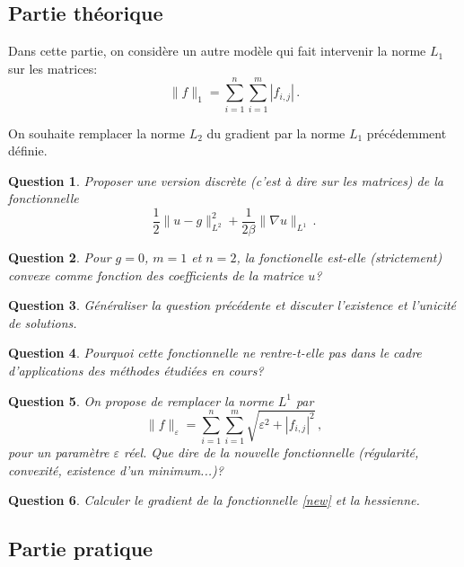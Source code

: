 \documentclass[10pt,a4paper,fleqn]{report}
\newtheorem{question}{Question}
\begin{document}
\subsection{Partie théorique}
Dans cette partie, on consid\`ere un autre mod\`ele qui fait intervenir la norme $L_1$ sur les matrices:
\begin{equation}
\| f \|_{1} = \sum_{i=1}^n \sum_{i=1}^m |f_{i,j}| \,.
\end{equation}

On souhaite remplacer la norme $L_2$ du gradient par la norme $L_1$ pr\'ec\'edemment d\'efinie.

\begin{question}
Proposer une version discr\`ete (c'est \`a dire sur les matrices) de la fonctionnelle $$ \frac12 \| u -  g\|^2_{L^2} + \frac{1}{2\beta}\| \nabla u \|_{L^1}\,.$$
\end{question}

\begin{question}
Pour $g=0$, $m=1$ et $n=2$, la fonctionelle est-elle (strictement) convexe comme fonction des coefficients de la matrice $u$?
\end{question}

\begin{question}
G\'en\'eraliser la question pr\'ec\'edente et discuter l'existence et l'unicit\'e de solutions.
\end{question}

\begin{question}
Pourquoi cette fonctionnelle ne rentre-t-elle pas dans le cadre d'applications des m\'ethodes \'etudi\'ees en cours?
\end{question}

\begin{question}
On propose de remplacer la norme $L^1$ par 
\begin{equation}
\| f \|_{\varepsilon} = \sum_{i=1}^n \sum_{i=1}^m \sqrt{\varepsilon^2 + |f_{i,j}|^2} \,,
\end{equation}
pour un param\`etre $\varepsilon$ r\'eel.
Que dire de la nouvelle fonctionnelle (r\'egularit\'e, convexit\'e, existence d'un minimum...)?
\end{question}

\begin{question}
Calculer le gradient de la fonctionnelle \eqref{new} et la hessienne.
\end{question}

\subsection{Partie pratique}
\end{document}
